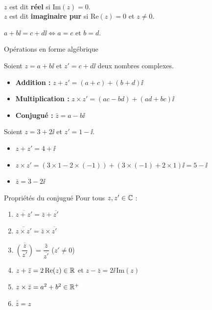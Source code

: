 \remarque\\
$z$ est dit \textbf{réel} si $\mathrm{Im}(z) = 0$.\\
$z$ est dit \textbf{imaginaire pur} si $\mathrm{Re}(z) = 0$ et $z \neq 0$.

\begin{definition}
	$a + b\ii = c + d\ii \iff a = c \text{ et } b = d$.
\end{definition}

\begin{propriete}{Opérations en forme algébrique}{}

	Soient $z = a + b\ii$ et $z' = c + d\ii$ deux nombres complexes.
	\begin{itemize}[label=\textbullet]
		\item \textbf{Addition :} $z + z' = (a+c) + (b+d)\ii$
		\item \textbf{Multiplication :} $z \times z' = (ac - bd) + (ad + bc)\ii$
		\item \textbf{Conjugué :} $\bar{z} = a - b\ii$
	\end{itemize}
\end{propriete}

\begin{exemple}
	Soient $z = 3 + 2\ii$ et $z' = 1 - \ii$.
	\begin{itemize}[label=\textbullet]
		\item $z + z' = 4 + \ii$
		\item $z \times z' = (3 \times 1 - 2 \times (-1)) + (3 \times (-1) + 2 \times 1)\ii
		= 5 - \ii$
		\item $\bar{z} = 3 - 2\ii$
	\end{itemize}
\end{exemple}

\begin{propriete}{Propriétés du conjugué}{}
	Pour tous $z, z' \in \mathbb{C}$ :
	\begin{enumerate}
		\item $\overline{z + z'} = \bar{z} + \overline{z'}$
		\item $\overline{z \times z'} = \bar{z} \times \overline{z'}$
		\item $\overline{\left(\dfrac{z}{z'}\right)} = \dfrac{\bar{z}}{\overline{z'}}$ \quad ($z' \neq 0$)
		\item $z + \bar{z} = 2\,\mathrm{Re}(z) \in \mathbb{R}$ \quad et \quad
		$z - \bar{z} = 2\ii\,\mathrm{Im}(z)$
		\item $z \times \bar{z} = a^2 + b^2 \in \mathbb{R}^+$
		\item $\bar{\bar{z}} = z$
	\end{enumerate}
\end{propriete}

